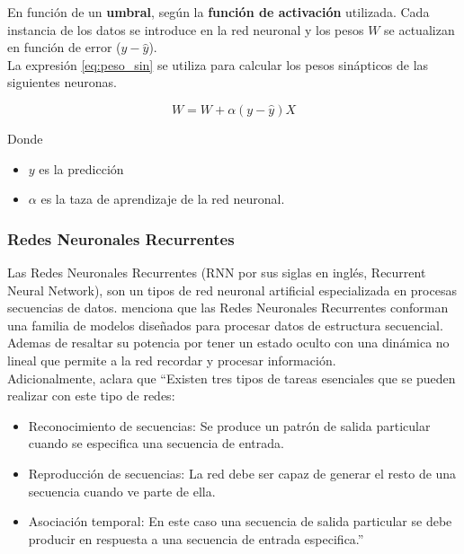     En función de un \textbf{umbral}, según la \textbf{función de activación} utilizada. Cada instancia de los datos se introduce en la red neuronal y los pesos $W$ se actualizan en función de error ($y-\hat{y}$).\\

    La expresión \ref{eq:peso_sin} se utiliza para calcular los pesos sinápticos de las siguientes neuronas.

    \begin{equation}
        W = W + \alpha (y-\hat{y})X
        \label{eq:peso_sin}
    \end{equation}

    Donde
    \begin{itemize}
        \item $y$ es la predicción 
        \item $\alpha$ es la taza de aprendizaje de la red neuronal.
    \end{itemize}

    \subsubsection{Redes Neuronales Recurrentes}
Las Redes Neuronales Recurrentes (RNN por sus siglas en inglés, Recurrent Neural Network), son un tipos de red neuronal artificial especializada en procesas secuencias de datos. \citep[p. 19]{bib21} menciona que las Redes Neuronales Recurrentes conforman una familia de modelos diseñados para procesar datos de estructura secuencial. Ademas de resaltar su potencia por tener un estado oculto con una dinámica no lineal que permite a la red recordar y procesar información.\\

Adicionalmente, \citet[p. 51]{bib22} aclara que ``Existen tres tipos de tareas esenciales que se pueden realizar con este tipo de redes:
\begin{itemize}
    \item Reconocimiento de secuencias:
    Se produce un patrón de salida particular cuando se especifica una secuencia de entrada.
    \item Reproducción de secuencias:
    La red debe ser capaz de generar el resto de una secuencia cuando ve parte de ella.
    \item Asociación temporal:
    En este caso una secuencia de salida particular se debe producir en respuesta a una secuencia de entrada especifica.''
\end{itemize}


